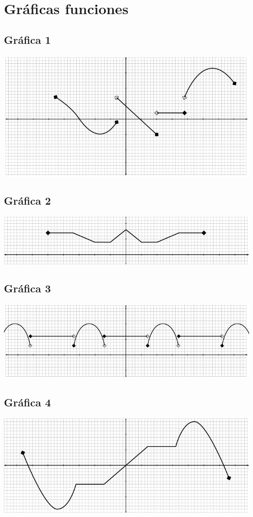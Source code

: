 \onecolumn
\chapter{Gráficas funciones}

\section{Gráfica 1}
\includegraphics{../img/graficas-funciones-1.png}

\section{Gráfica 2}
\includegraphics{../img/graficas-funciones-2.png}

\section{Gráfica 3}
\includegraphics{../img/graficas-funciones-3.png}

\section{Gráfica 4}
\includegraphics{../img/graficas-funciones-4.png}

